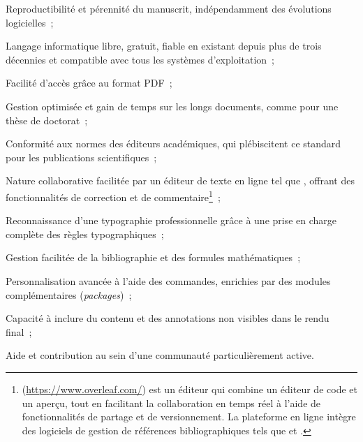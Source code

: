     \begin{customitemize}
\item Reproductibilité et pérennité du manuscrit, indépendamment des évolutions logicielles~;
\item Langage informatique libre, gratuit, fiable en existant depuis plus de trois décennies et compatible avec tous les systèmes d'exploitation~;
\item Facilité d'accès grâce au format PDF~;
\item Gestion optimisée et gain de temps sur les longs documents, comme pour une thèse de doctorat~;
\item Conformité aux normes des éditeurs académiques, qui plébiscitent ce standard pour les publications scientifiques~;
\item Nature collaborative facilitée par un éditeur de texte en ligne tel que , offrant des fonctionnalités de correction et de commentaire\footnote{
 (\url{https://www.overleaf.com/}) est un éditeur \latexword{\LaTeX} qui combine un éditeur de code et un aperçu, tout en facilitant la collaboration en temps réel à l'aide de fonctionnalités de partage et de versionnement. La plateforme en ligne intègre des logiciels de gestion de références bibliographiques tels que  et .
}~;
\item Reconnaissance d'une typographie professionnelle grâce à une prise en charge complète des règles typographiques~;
\item Gestion facilitée de la bibliographie et des formules mathématiques~;
\item Personnalisation avancée à l'aide des commandes, enrichies par des modules complémentaires (\textit{packages})~;
\item Capacité à inclure du contenu et des annotations non visibles dans le rendu final~;
\item Aide et contribution au sein d'une communauté \latexword{\LaTeX} particulièrement active.
    \end{customitemize}%

